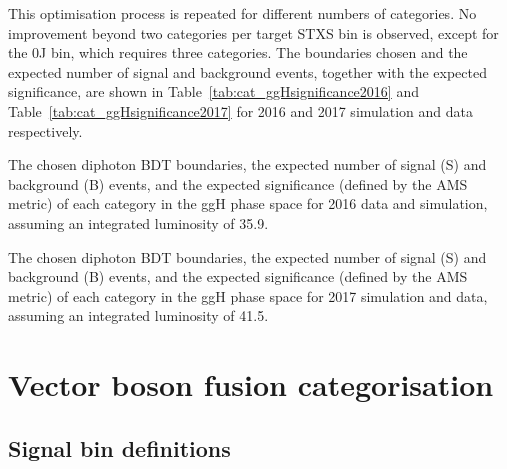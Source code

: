 This optimisation process is repeated for different numbers of categories.
No improvement beyond two categories per target STXS bin is observed, 
except for the 0J bin, which requires three categories.
The boundaries chosen and the expected number of signal and background events, 
together with the expected significance, 
are shown in Table~\ref{tab:cat_ggHsignificance2016} and Table~\ref{tab:cat_ggHsignificance2017} 
for 2016 and 2017 simulation and data respectively.

\begin{table}
  \begin{centering}
    
    \caption[Definitions of 2016 categories targeting ggH production.]
    {
      The chosen diphoton BDT boundaries, 
      the expected number of signal (S) and background (B) events, 
      and the expected significance (defined by the AMS metric) of each category in the ggH phase space 
      for 2016 data and simulation, assuming an integrated luminosity of \SI{35.9}{\fbinv}.
    }
    \label{tab:cat_ggHsignificance2016}
  \end{centering}
\end{table}

\begin{table}
  \begin{centering}
    
    \caption[Definitions of 2017 categories targeting ggH production.]
    {
      The chosen diphoton BDT boundaries, 
      the expected number of signal (S) and background (B) events, 
      and the expected significance (defined by the AMS metric) of each category in the ggH phase space 
      for 2017 simulation and data, assuming an integrated luminosity of \SI{41.5}{\fbinv}.
    }
    \label{tab:cat_ggHsignificance2017}
  \end{centering}
\end{table}

\section{Vector boson fusion categorisation}
\subsection{Signal bin definitions}

